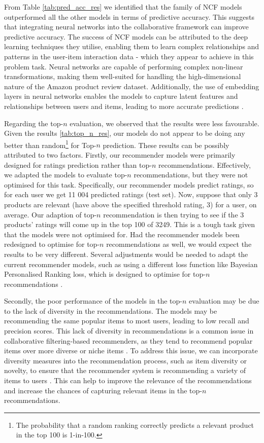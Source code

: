 From Table \ref{tab:pred_acc_res} we identified that the family of NCF models outperformed all the other models in terms of predictive accuracy. This suggests that integrating neural networks into the collaborative framework can improve predictive accuracy. The success of NCF models can be attributed to the deep learning techniques they utilise, enabling them to learn complex relationships and patterns in the user-item interaction data \cite{he2017neural} - which they appear to achieve in this problem task.  Neural networks are capable of performing complex non-linear transformations, making them well-suited for handling the high-dimensional nature of the Amazon product review dataset. Additionally, the use of embedding layers in neural networks enables the models to capture latent features and relationships between users and items, leading to more accurate predictions \cite{he2017neural}. 

Regarding the top-$n$ evaluation, we observed that the results were less favourable.  Given the results \ref{tab:top_n_res}, our models do not appear to be doing any better than random\footnote{The probability that a random ranking correctly predicts a relevant product in the top 100 is 1-in-100.} for Top-$n$ prediction. These results can be possibly attributed to two factors. Firstly, our recommender models were primarily designed for ratings prediction rather than top-$n$ recommendations. Effectively, we adapted the models to evaluate top-$n$ recommendations, but they were not optimised for this task. Specifically, our recommender models predict ratings, so for each user we get 11 004 predicted ratings (test set). Now, suppose that only 3 products are relevant (have above the specified threshold rating, 3) for a user, on average. Our adaption of top-$n$ recommendation is then trying to see if the 3 products' ratings will come up in the top 100 of 3249. This is a tough task given that the models were not optimised for. Had the recommender models been redesigned to optimise for top-$n$ recommendations as well, we would expect the results to be very different. Several adjustments would be needed to adapt the current recommender models, such as using a different loss function like Bayesian Personalised Ranking loss, which is designed to optimise for top-$n$ recommendations \cite{rendle2010factorization}.

Secondly, the poor performance of the models in the top-$n$ evaluation may be due to the lack of diversity in the recommendations. The models may be recommending the same popular items to most users, leading to low recall and precision scores. This lack of diversity in recommendations is a common issue in collaborative filtering-based recommenders, as they tend to recommend popular items over more diverse or niche items \cite{adomavicius2005toward}. To address this issue, we can incorporate diversity measures into the recommendation process, such as item diversity or novelty, to ensure that the recommender system is recommending a variety of items to users \cite{steck2013evaluation}. This can help to improve the relevance of the recommendations and increase the chances of capturing relevant items in the top-$n$ recommendations. 

